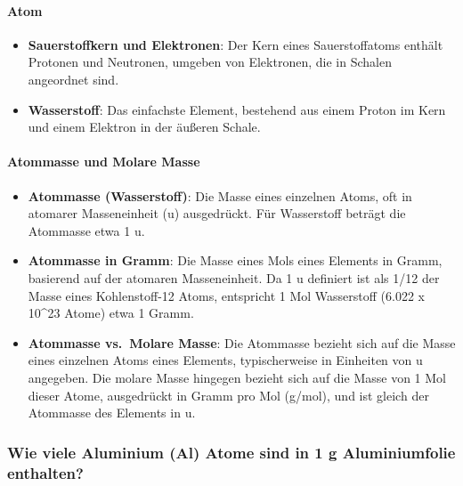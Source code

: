 \documentclass{vorlage-design-main}
\begin{document}
\hypertarget{atom}{%
\paragraph{Atom}\label{atom}}

\begin{itemize}

\item
  \textbf{Sauerstoffkern und Elektronen}: Der Kern eines Sauerstoffatoms
  enthält Protonen und Neutronen, umgeben von Elektronen, die in Schalen
  angeordnet sind.
\item
  \textbf{Wasserstoff}: Das einfachste Element, bestehend aus einem
  Proton im Kern und einem Elektron in der äußeren Schale.
\end{itemize}

\hypertarget{atommasse-und-molare-masse}{%
\paragraph{Atommasse und Molare
Masse}\label{atommasse-und-molare-masse}}

\begin{itemize}

\item
  \textbf{Atommasse (Wasserstoff)}: Die Masse eines einzelnen Atoms, oft
  in atomarer Masseneinheit (u) ausgedrückt. Für Wasserstoff beträgt die
  Atommasse etwa 1 u.
\item
  \textbf{Atommasse in Gramm}: Die Masse eines Mols eines Elements in
  Gramm, basierend auf der atomaren Masseneinheit. Da 1 u definiert ist
  als 1/12 der Masse eines Kohlenstoff-12 Atoms, entspricht 1 Mol
  Wasserstoff (6.022 x 10\^{}23 Atome) etwa 1 Gramm.
\item
  \textbf{Atommasse vs.~Molare Masse}: Die Atommasse bezieht sich auf
  die Masse eines einzelnen Atoms eines Elements, typischerweise in
  Einheiten von u angegeben. Die molare Masse hingegen bezieht sich auf
  die Masse von 1 Mol dieser Atome, ausgedrückt in Gramm pro Mol
  (g/mol), und ist gleich der Atommasse des Elements in u.
\end{itemize}

\hypertarget{wie-viele-aluminium-al-atome-sind-in-1-g-aluminiumfolie-enthalten}{%
\subsubsection{Wie viele Aluminium (Al) Atome sind in 1 g Aluminiumfolie
enthalten?}\label{wie-viele-aluminium-al-atome-sind-in-1-g-aluminiumfolie-enthalten}}
\end{document}
